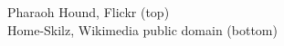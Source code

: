 \documentclass[t]{beamer}
\begin{document}
{
\begin{frame}[b]
	
\tiny  Pharaoh Hound, Flickr  (top)\\Home-Skilz, Wikimedia public domain (bottom)
\end{frame}
}
%	
%	
%
%	
%	
%
%
%	
%	
%
%	
%	
%	
%	
%
%
%
%	
%		
%	
%	
\end{document}
